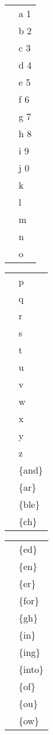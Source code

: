 \documentclass[draft]{article}
\newcommand{\mytable}[1]{%
    \enskip\begin{tabular}[t]{r|l} 
    \hline #1 \hline
    \end{tabular}\enskip}
\begin{document}
\begin{center}
\mytable{
\braille{a} & a 1 \\
\braille{b} & b 2 \\
\braille{c} & c 3 \\
\braille{d} & d 4 \\
\braille{e} & e 5 \\
\braille{f} & f 6 \\
\braille{g} & g 7 \\
\braille{h} & h 8 \\
\braille{i} & i 9 \\
\braille{j} & j 0 \\
\braille{k} & k \\
\braille{l} & l \\
\braille{m} & m \\
\braille{n} & n \\
\braille{o} & o \\
}
\mytable{
\braille{p} & p \\
\braille{q} & q \\
\braille{r} & r \\
\braille{s} & s \\
\braille{t} & t \\
\braille{u} & u \\
\braille{v} & v \\
\braille{w} & w \\
\braille{x} & x \\
\braille{y} & y \\
\braille{z} & z \\
\braille{{and}} & \{and\} \\
\braille{{ar}} & \{ar\} \\
\braille{{ble}} & \{ble\} \\
\braille{{ch}} & \{ch\} \\
}
\mytable{
\braille{{ed}} & \{ed\} \\
\braille{{en}} & \{en\} \\
\braille{{er}} & \{er\} \\
\braille{{for}} & \{for\} \\
\braille{{gh}} & \{gh\} \\
\braille{{in}} & \{in\} \\
\braille{{ing}} & \{ing\} \\
\braille{{into}} & \{into\} \\
\braille{{of}} & \{of\} \\
\braille{{ou}} & \{ou\} \\
\braille{{ow}} & \{ow\} \\
}
\end{center}
\end{document}
